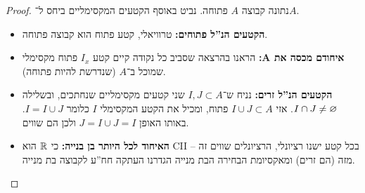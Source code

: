 \documentclass[]{../../../../tex/classes/homework}
\begin{document}
	\begin{proof}
		נתונה קבוצה $A$ פתוחה. נביט באוסף הקטעים המקסימליים ביחס ל־$A$. 
		\begin{itemize}
			\item \textbf{הקטעים הנ''ל פתוחים: }טרוויאלי, קטע פתוח הוא קבוצה פתוחה. 
			\item \textbf{איחודם מכסה את $\bm{A}$: }הראנו בהרצאה שסביב כל נקודה קיים קטע $I_x$ פתוח מקסימלי שמוכל ב־$A$ (שנדרשת להיות פתוחה). 
			\item \textbf{הקטעים הנ''ל זרים: }נניח ש־$I, J \subset A$ שני קטעים מקסימליים שנחתכים, ובשלילה $I \cap J \neq \varnothing$. אזי $I \cup J \subset A$ פתוח, ומכיל את הקטע המקסימלי $I$ כלומר $I = I \cup J$. באותו האופן $J = I \cup J = I$ ולכן הם שווים. 
			\item \textbf{האיחוד לכל היותר בן בנייה: }כי $\mathbb{R}$ הוא CII – בכל קטע ישנו רציונלי, הרציונלים שווים זה מזה (הם זרים) ומאקסיומת הבחירה הבת מנייה הגדרנו העתקה חח''ע לקבוצה בת מנייה. 
		\end{itemize}
	\end{proof}
	
	\ndoc
\end{document}
